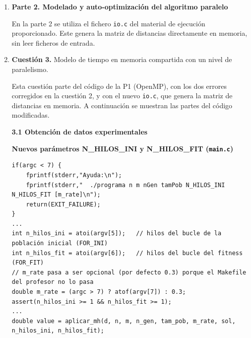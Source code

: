 \documentclass[12pt]{article}
\begin{document}
\begin{enumerate}
Para esta instancia y las configuraciones medidas, el mejor híbrido es $1\times12$: alrededor de 6.44 veces más rápido que el secuencial y 3.13 veces más rápido que la mejor configuración MPI, con un tiempo muy próximo al de OpenMP con doce hilos.


\newpage
\item[] \textbf{\large Parte 2. Modelado y auto-optimización del algoritmo paralelo}

En la parte 2 se utiliza el fichero \texttt{io.c} del material de ejecución proporcionado. Este genera la matriz de distancias directamente en memoria, sin leer ficheros de entrada.

\item \textbf{Cuestión 3.} Modelo de tiempo en memoria compartida con un nivel de paralelismo.


Esta cuestión parte del código de la P1 (OpenMP), con los dos errores corregidos en la cuestión 2, y con el nuevo \texttt{io.c}, que genera la matriz de distancias en memoria. A continuación se muestran las partes del código modificadas.

\medskip
\noindent\textbf{3.1 Obtención de datos experimentales}\par
\smallskip


\medskip
\noindent\textbf{Nuevos parámetros N\_HILOS\_INI y N\_HILOS\_FIT (\texttt{main.c})}\par
\smallskip

\begin{lstlisting}[style=EstiloC]
if(argc < 7) {
	fprintf(stderr,"Ayuda:\n");
	fprintf(stderr,"  ./programa n m nGen tamPob N_HILOS_INI N_HILOS_FIT [m_rate]\n");
	return(EXIT_FAILURE);
}
...
int n_hilos_ini = atoi(argv[5]);   // hilos del bucle de la población inicial (FOR_INI)
int n_hilos_fit = atoi(argv[6]);   // hilos del bucle del fitness (FOR_FIT)
// m_rate pasa a ser opcional (por defecto 0.3) porque el Makefile del profesor no lo pasa
double m_rate = (argc > 7) ? atof(argv[7]) : 0.3;
assert(n_hilos_ini >= 1 && n_hilos_fit >= 1);
...
double value = aplicar_mh(d, n, m, n_gen, tam_pob, m_rate, sol, n_hilos_ini, n_hilos_fit);
\end{lstlisting}


\end{enumerate}
\end{document}
